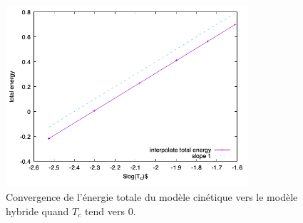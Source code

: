 \begin{figure}[h]
  \centering
  \includegraphics[width=0.8\textwidth]{img/limit_slope_totalenergy.png}
  \caption{Convergence de l'énergie totale du modèle cinétique vers le modèle hybride quand $T_c$ tend vers $0$.}
  \label{fig:limit:totalenergy:slope}
\end{figure}

